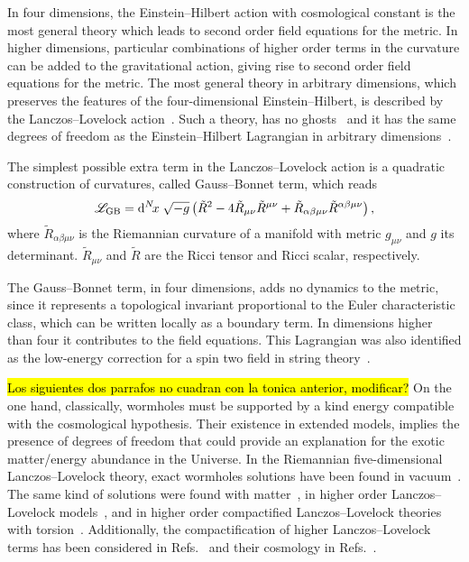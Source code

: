 \documentclass[aps,prd,12pt,superscriptaddress,showpacs,showkeys,longbibliography,reprint,nofootinbib]{revtex4-1}
\begin{document}
In four dimensions, the Einstein--Hilbert action with cosmological constant is the most general theory which leads to second order field equations for the metric. In higher dimensions, particular combinations of higher order terms in the curvature can be added to the gravitational action, giving rise to second order field equations for the metric. The most general theory in arbitrary dimensions, which preserves the features of the four-dimensional Einstein--Hilbert, is described by the Lanczos--Lovelock action~\cite{Lanczos:1938sf,*Lovelock:1971yv}. Such a theory, has no ghosts~\cite{Zumino:1985dp} and it has the same degrees of freedom as the Einstein--Hilbert Lagrangian in arbitrary dimensions~\cite{Henneaux:1990au}.

The simplest possible extra term in the Lanczos--Lovelock action  is a quadratic construction of curvatures, called Gauss--Bonnet term, which reads
\begin{equation}\label{GB}
  \mathcal{L}_{\mathrm{GB}} = {\mathrm{d}}^{N}\!{x}\;\sqrt{-g}\left(\tilde{R}^2-4\tilde{R}_{\mu\nu}\tilde{R}^{\mu\nu}+\tilde{R}_{\alpha\beta\mu\nu}
  \tilde{R}^{\alpha\beta\mu\nu}\right),
\end{equation}
where $\tilde{R}_{\alpha\beta\mu\nu}$ is the Riemannian curvature of a manifold with metric $g_{\mu\nu}$ and $g$ its determinant. $\tilde{R}_{\mu\nu}$ and $\tilde{R}$ are the Ricci tensor and Ricci scalar, respectively.

The Gauss--Bonnet term, in four dimensions, adds no dynamics to the metric, since it represents a topological invariant proportional to the Euler characteristic class, which can be written locally as a boundary term. In dimensions higher than four it contributes to the field equations. This Lagrangian was also identified as the low-energy correction for a spin two field in string theory~\cite{Zwiebach:1985uq}.

\hl{Los siguientes dos parrafos no cuadran con la tonica anterior, modificar?}
On the one hand, classically, wormholes must be supported by a kind energy compatible with the cosmological hypothesis. Their existence in extended models, implies the presence of degrees of freedom that could provide an explanation for the exotic matter/energy abundance in the Universe. In the Riemannian five-dimensional Lanczos--Lovelock theory, exact wormholes solutions have been found in vacuum~\cite{Dotti:2006cp,*Dotti:2007az}. The same kind of solutions were found with matter~\cite{Mehdizadeh:2015jra}, in higher order Lanczos--Lovelock models~\cite{Mehdizadeh:2015dta}, and in higher order compactified Lanczos--Lovelock theories with torsion~\cite{Canfora:2008ka}. Additionally, the compactification of higher Lanczos--Lovelock terms has been considered in Refs.~\cite{MuellerHoissen:1985mm,*MuellerHoissen:1989yv} and their cosmology in Refs.~\cite{MuellerHoissen:1985ij,Deruelle:1986iv,Deruelle:1989fj}.  
\end{document}
